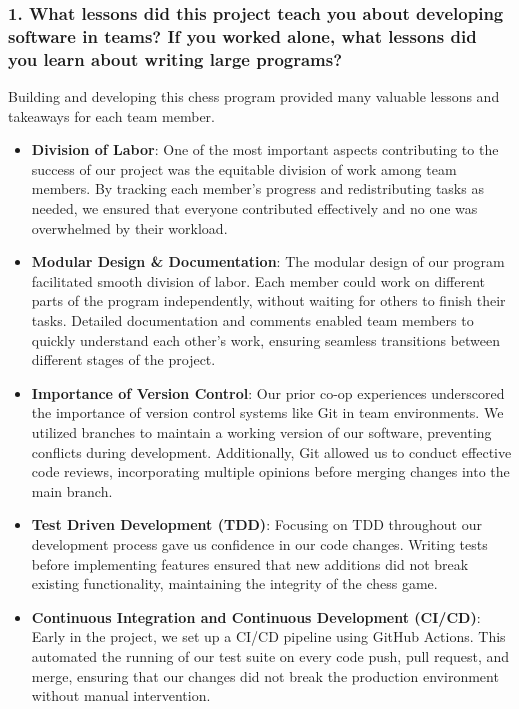 \documentclass[12pt]{article}
\begin{document}
\subsubsection*{1. What lessons did this project teach you about developing software in teams? If you worked alone, what lessons did you learn about writing large programs?}
Building and developing this chess program provided many valuable lessons and takeaways for each team member.
\begin{itemize}
    \item \textbf{Division of Labor}: One of the most important aspects contributing to the success of our project was the equitable division of work among team members. By tracking each member’s progress and redistributing tasks as needed, we ensured that everyone contributed effectively and no one was overwhelmed by their workload.
    \item \textbf{Modular Design \& Documentation}: The modular design of our program facilitated smooth division of labor. Each member could work on different parts of the program independently, without waiting for others to finish their tasks. Detailed documentation and comments enabled team members to quickly understand each other’s work, ensuring seamless transitions between different stages of the project.
    \item \textbf{Importance of Version Control}: Our prior co-op experiences underscored the importance of version control systems like Git in team environments. We utilized branches to maintain a working version of our software, preventing conflicts during development. Additionally, Git allowed us to conduct effective code reviews, incorporating multiple opinions before merging changes into the main branch.
    \item \textbf{Test Driven Development (TDD)}: Focusing on TDD throughout our development process gave us confidence in our code changes. Writing tests before implementing features ensured that new additions did not break existing functionality, maintaining the integrity of the chess game.
    \item \textbf{Continuous Integration and Continuous Development (CI/CD)}: Early in the project, we set up a CI/CD pipeline using GitHub Actions. This automated the running of our test suite on every code push, pull request, and merge, ensuring that our changes did not break the production environment without manual intervention.
\end{itemize}
\end{document}
